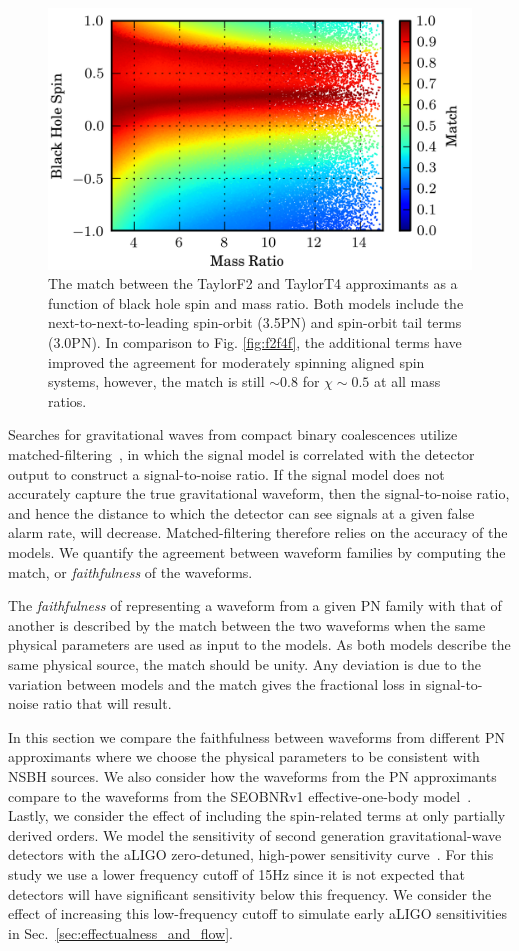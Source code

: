 \begin{figure}
\begin{center}
\includegraphics[width=1.0	extwidth]{papers/nsbh_faithfulness/figure3.png}
\end{center}
\caption{\label{fig:f2t4fso}The match between the TaylorF2 and TaylorT4 approximants
as a function of black hole spin and mass ratio. Both models include
the next-to-next-to-leading spin-orbit (3.5\ac{PN}) and spin-orbit tail 
terms (3.0\ac{PN}). In comparison to Fig. \ref{fig:f2f4f}, the additional terms have 
improved the agreement for moderately spinning aligned spin systems, however, the
match is still $ \sim 0.8 $ for $\chi \sim 0.5 $ at all mass ratios.}

\end{figure}

Searches for gravitational waves from compact binary coalescences utilize
matched-filtering~\cite{Wainstein,Allen:2005fk}, in which the signal model is
correlated with the detector output to construct a signal-to-noise
ratio. If the signal model does not accurately capture the true gravitational
waveform, then the signal-to-noise ratio, and hence the distance to which the
detector can see signals at a given false alarm rate, will decrease. Matched-filtering 
therefore relies on the accuracy of the models. We quantify the 
agreement between waveform families by computing the match, or
\emph{faithfulness} of the waveforms.

The \emph{faithfulness} of representing a waveform from a given \ac{PN} family with
that of another is described by the match between the two waveforms when the
same physical parameters are used as input to the models. As both models
describe the same physical source, the match should be unity. Any deviation is
due to the variation between models and the match gives the fractional loss in
signal-to-noise ratio that will result.

In this section we compare the faithfulness between waveforms from different
\ac{PN} approximants where we choose the physical parameters to be consistent
with \ac{NSBH} sources.  We also consider how the waveforms from the \ac{PN}
approximants compare to the waveforms from the SEOBNRv1 effective-one-body
model~\cite{Taracchini:2012ig}. Lastly, we consider the effect of including 
the spin-related terms at only partially derived orders. 
We model the sensitivity of second generation  gravitational-wave detectors with the aLIGO
zero-detuned, high-power sensitivity curve~\cite{aLIGOSensCurves}. For this
study we use a lower frequency cutoff of 15Hz since it is not expected that
detectors will have significant sensitivity below this frequency. We consider
the effect of increasing this low-frequency cutoff to simulate early aLIGO
sensitivities in Sec.~\ref{sec:effectualness_and_flow}.

